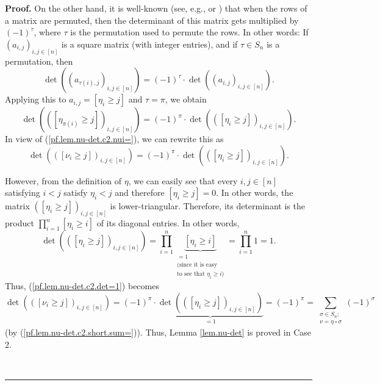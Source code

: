 \documentclass[numbers=enddot,12pt,final,onecolumn,notitlepage,english]{scrartcl}%
\theoremstyle{definition}
\newenvironment{proof}[1][Proof]{\noindent\textbf{#1.} }{\ \rule{0.5em}{0.5em}}
\let\sumnonlimits\sum
\let\prodnonlimits\prod
\renewcommand{\sum}{\sumnonlimits\limits}
\renewcommand{\prod}{\prodnonlimits\limits}
\newenvironment{vershort}{}{}
\begin{document}
\begin{proof}
On the other hand, it is well-known (see, e.g., \cite[Corollary 6.4.15]{21s}
or \cite[Lemma 6.17 \textbf{(a)}]{detnotes}) that when the rows of a matrix
are permuted, then the determinant of this matrix gets multiplied by $\left(
-1\right)  ^{\tau}$, where $\tau$ is the permutation used to permute the rows.
In other words: If $\left(  a_{i,j}\right)  _{i,j\in\left[  n\right]  }$ is a
square matrix (with integer entries), and if $\tau\in S_{n}$ is a permutation,
then%
\[
\det\left(  \left(  a_{\tau\left(  i\right)  ,j}\right)  _{i,j\in\left[
n\right]  }\right)  =\left(  -1\right)  ^{\tau}\cdot\det\left(  \left(
a_{i,j}\right)  _{i,j\in\left[  n\right]  }\right)  .
\]
Applying this to $a_{i,j}=\left[  \eta_{i}\geq j\right]  $ and $\tau=\pi$, we
obtain%
\[
\det\left(  \left(  \left[  \eta_{\pi\left(  i\right)  }\geq j\right]
\right)  _{i,j\in\left[  n\right]  }\right)  =\left(  -1\right)  ^{\pi}%
\cdot\det\left(  \left(  \left[  \eta_{i}\geq j\right]  \right)
_{i,j\in\left[  n\right]  }\right)  .
\]
In view of (\ref{pf.lem.nu-det.c2.nui=}), we can rewrite this as%
\begin{equation}
\det\left(  \left(  \left[  \nu_{i}\geq j\right]  \right)  _{i,j\in\left[
n\right]  }\right)  =\left(  -1\right)  ^{\pi}\cdot\det\left(  \left(  \left[
\eta_{i}\geq j\right]  \right)  _{i,j\in\left[  n\right]  }\right)  .
\label{pf.lem.nu-det.c2.det=1}%
\end{equation}


\begin{vershort}
However, from the definition of $\eta$, we can easily see that every
$i,j\in\left[  n\right]  $ satisfying $i<j$ satisfy $\eta_{i}<j$ and therefore
$\left[  \eta_{i}\geq j\right]  =0$. In other words, the matrix $\left(
\left[  \eta_{i}\geq j\right]  \right)  _{i,j\in\left[  n\right]  }$ is
lower-triangular. Therefore, its determinant is the product $\prod_{i=1}%
^{n}\left[  \eta_{i}\geq i\right]  $ of its diagonal entries. In other words,%
\[
\det\left(  \left(  \left[  \eta_{i}\geq j\right]  \right)  _{i,j\in\left[
n\right]  }\right)  =\prod_{i=1}^{n}\underbrace{\left[  \eta_{i}\geq i\right]
}_{\substack{=1\\\text{(since it is easy}\\\text{to see that }\eta_{i}\geq
i\text{)}}}=\prod_{i=1}^{n}1=1.
\]
Thus, (\ref{pf.lem.nu-det.c2.det=1}) becomes%
\[
\det\left(  \left(  \left[  \nu_{i}\geq j\right]  \right)  _{i,j\in\left[
n\right]  }\right)  =\left(  -1\right)  ^{\pi}\cdot\underbrace{\det\left(
\left(  \left[  \eta_{i}\geq j\right]  \right)  _{i,j\in\left[  n\right]
}\right)  }_{=1}=\left(  -1\right)  ^{\pi}=\sum_{\substack{\sigma\in
S_{n};\\\nu=\eta\circ\sigma}}\left(  -1\right)  ^{\sigma}%
\]
(by (\ref{pf.lem.nu-det.c2.short.sum=})). Thus, Lemma \ref{lem.nu-det} is
proved in Case 2. \medskip
\end{vershort}


\end{proof}
\end{document}
